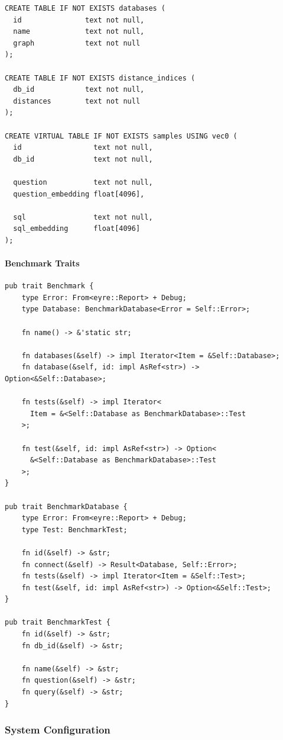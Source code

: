 \begin{verbatim}
CREATE TABLE IF NOT EXISTS databases (
  id               text not null,
  name             text not null,
  graph            text not null
);

CREATE TABLE IF NOT EXISTS distance_indices (
  db_id            text not null,
  distances        text not null
);

CREATE VIRTUAL TABLE IF NOT EXISTS samples USING vec0 (
  id                 text not null,
  db_id              text not null,

  question           text not null,
  question_embedding float[4096],

  sql                text not null,
  sql_embedding      float[4096]
);
\end{verbatim}

\paragraph{Benchmark Traits}\label{appendix:benchmark-traits}

\begin{verbatim}
pub trait Benchmark {
    type Error: From<eyre::Report> + Debug;
    type Database: BenchmarkDatabase<Error = Self::Error>;

    fn name() -> &'static str;

    fn databases(&self) -> impl Iterator<Item = &Self::Database>;
    fn database(&self, id: impl AsRef<str>) -> Option<&Self::Database>;

    fn tests(&self) -> impl Iterator<
      Item = &<Self::Database as BenchmarkDatabase>::Test
    >;

    fn test(&self, id: impl AsRef<str>) -> Option<
      &<Self::Database as BenchmarkDatabase>::Test
    >;
}

pub trait BenchmarkDatabase {
    type Error: From<eyre::Report> + Debug;
    type Test: BenchmarkTest;

    fn id(&self) -> &str;
    fn connect(&self) -> Result<Database, Self::Error>;
    fn tests(&self) -> impl Iterator<Item = &Self::Test>;
    fn test(&self, id: impl AsRef<str>) -> Option<&Self::Test>;
}

pub trait BenchmarkTest {
    fn id(&self) -> &str;
    fn db_id(&self) -> &str;

    fn name(&self) -> &str;
    fn question(&self) -> &str;
    fn query(&self) -> &str;
}
\end{verbatim}

\subsubsection{System Configuration}\label{appendix:system-config}

